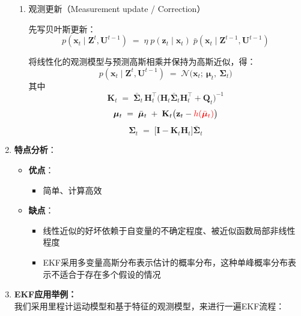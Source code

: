 \documentclass[../main.tex]{subfiles}
\begin{document}
\begin{enumerate}
{{\begin{enumerate}
    使用上述线性化近似并代入 $\mathbf{x}_{t-1}\sim\mathcal{N}(\boldsymbol{\mu}_{t-1},\boldsymbol{\Sigma}_{t-1})$，得到高斯近似\footnote{两个高斯分布的卷积仍为高斯分布}：
    $$
    \bar{p}(\mathbf{x}_t\mid \mathbf{Z}^{t-1},\mathbf{U}^{t-1}) \;=\; \mathcal{N}\big(\mathbf{x}_t;\ \bar{\boldsymbol{\mu}}_t,\ \bar{\boldsymbol{\Sigma}}_t\big)
    $$
    其中
    $$
    \bar{\boldsymbol{\mu}}_t \;=\; \textcolor{red}{g(\boldsymbol{\mu}_{t-1},\mathbf{u}_{t-1})}
    $$
    $$
    \bar{\boldsymbol{\Sigma}}_t \;=\; \mathbf{G}_t\,\boldsymbol{\Sigma}_{t-1}\,\mathbf{G}_t^\top \;+\; \mathbf{R}_t
    $$
    
    \item 观测更新（Measurement update / Correction）
    
    先写贝叶斯更新：
    $$
    p(\mathbf{x}_t\mid \mathbf{Z}^t,\mathbf{U}^{t-1}) \;=\; \eta\; p(\mathbf{z}_t\mid \mathbf{x}_t)\; \bar{p}(\mathbf{x}_t\mid \mathbf{Z}^{t-1},\mathbf{U}^{t-1})
    $$
    
    将线性化的观测模型与预测高斯相乘并保持为高斯近似，得：
    $$
    p(\mathbf{x}_t\mid \mathbf{Z}^t,\mathbf{U}^{t-1}) \;=\; \mathcal{N}\big(\mathbf{x}_t;\ \boldsymbol{\mu}_t,\ \boldsymbol{\Sigma}_t\big)
    $$
    其中
    $$
    \mathbf{K}_t \;=\; \bar{\boldsymbol{\Sigma}}_t \,\mathbf{H}_t^\top \big(\mathbf{H}_t \bar{\boldsymbol{\Sigma}}_t \mathbf{H}_t^\top + \mathbf{Q}_t\big)^{-1}
    $$
    $$
    \boldsymbol{\mu}_t \;=\; \bar{\boldsymbol{\mu}}_t \;+\; \mathbf{K}_t\big(\mathbf{z}_t - \textcolor{red}{h(\bar{\boldsymbol{\mu}}_t)}\big)
    $$
    $$
    \boldsymbol{\Sigma}_t \;=\; \big[\mathbf{I} - \mathbf{K}_t \mathbf{H}_t\big] \bar{\boldsymbol{\Sigma}}_t
    $$
    
  \end{enumerate}
  }}
    \item \textbf{特点分析}：
    \begin{itemize}
        \item \textbf{优点}：
            \begin{itemize}
                \item 简单、计算高效
            \end{itemize}
        \item \textbf{缺点}：            
            \begin{itemize}
                \item 线性近似的好坏依赖于自变量的不确定程度、被近似函数局部非线性程度
                \item EKF采用多变量高斯分布表示估计的概率分布，这种单峰概率分布表示不适合于存在多个假设的情况
            \end{itemize}         
    \end{itemize}
    \item \textbf{EKF应用举例：}
    \\我们采用里程计运动模型和基于特征的观测模型，来进行一遍EKF流程：
  {\small{}}
\end{enumerate}
\end{document}
